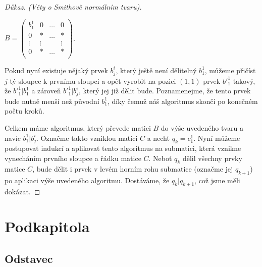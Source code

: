 \begin{proof}[Důkaz. (Věty o Smithově normálním tvaru)]
\begin{center}
$ B =
    \begin{pmatrix}
        b_1^1   & 0      & \hdots & 0       \\
        0       & \ast   & \hdots & \ast    \\
        \vdots  & \vdots &        & \vdots   \\
        0       & \ast   & \hdots & \ast    \\
    \end{pmatrix}
$.
\end{center}


Pokud nyní existuje nějaký prvek $ b_j^i $, který ještě není dělitelný $ b_1^1 $, můžeme
přičíst $j$-tý sloupec k prvnímu sloupci a opět vyrobit na pozici $ (1, 1) $ prvek $ {b'}_{1}^{1} $
takový, že $ {b'}_{1}^{1} \vert b_1^1 $ a zároveň $ {b'}_{1}^{1} \vert b_j^i $,
který jej již dělit bude. Poznamenejme, že tento prvek bude nutně menší než původní
$ b_1^1 $, díky čemuž náš algoritmus skončí po konečném počtu kroků.

Celkem máme algoritmus, který převede matici $B$ do výše uvedeného tvaru a navíc
$ {b}_{1}^{1} \vert b_j^i $. Označme takto vzniklou matici $ C $ a nechť $ q_k = c_1^1 $.
Nyní můžeme postupovat indukcí a aplikovat tento algoritmus
na submatici, která vznikne vynecháním prvního sloupce a řádku matice $C$.
Neboť $ q_k $ dělil všechny prvky matice $C$, bude dělit i prvek v levém
horním rohu submatice (označme jej $ q_{k+1} $) po aplikaci výše uvedeného algoritmu.
Dostáváme, že $ q_k \vert q_{k+1}$, což jsme měli dokázat.



\end{proof}
\section{Podkapitola}

\lipsum[98-105]

\subsection{Odstavec}

\lipsum[140-145]
\shorthandon{-}
